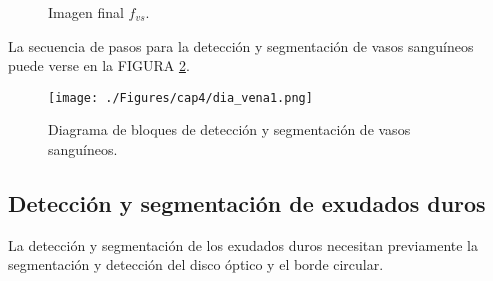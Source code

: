 
\begin{figure}[H]
\centering
{}
\caption{Imagen final $f_{vs}$.} \label{fig:vaso_8}
\end{figure}

La secuencia de pasos para la detección y segmentación de vasos sanguíneos puede verse en la FIGURA \ref{fig:bloquesVS}.




\begin{figure}[H]
	\centering
		\texttt{[image: ./Figures/cap4/dia\_vena1.png]}
	\caption{Diagrama de bloques de detección y segmentación de vasos sanguíneos.}
	\label{fig:bloquesVS}
\end{figure}

	
	


\subsection{Detección y segmentación de exudados duros} 
La detección y segmentación de los exudados duros necesitan previamente la segmentación y detección del disco óptico y el borde circular. 

